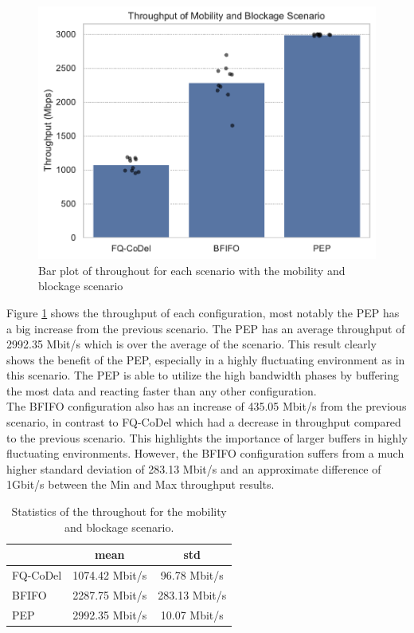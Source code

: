 \documentclass[a4paper,english, 12pt]{report}
\begin{document}
\begin{figure}[!h!] %
	\centering
	\includegraphics[scale=0.70]{../diagrams/witestlab/throughput/throughput_mobb.pdf}
  	\caption{Bar plot of throughout for each scenario with the mobility and blockage scenario}
  	\label{fig:throughput_mobb}
\end{figure}

Figure \ref{fig:throughput_mobb} shows the throughput of each configuration, most notably the PEP has a big increase from the previous scenario. The PEP has an average throughput of 2992.35 Mbit/s which is over the average of the scenario. This result clearly shows the benefit of the PEP, especially in a highly fluctuating environment as in this scenario. The PEP is able to utilize the high bandwidth phases by buffering the most data and reacting faster than any other configuration.\\

The BFIFO configuration also has an increase of 435.05 Mbit/s from the previous scenario, in contrast to FQ-CoDel which had a decrease in throughput compared to the previous scenario. This highlights the importance of larger buffers in highly fluctuating environments. However, the BFIFO configuration suffers from a much higher standard deviation of 283.13 Mbit/s and an approximate difference of 1Gbit/s between the Min and Max throughput results.\\

\begin{table}[h!]
\centering
\begin{tabular}{l|c|c}
\hline
 & \textbf{mean} & \textbf{std}  \\ 
\hline
FQ-CoDel & 1074.42 Mbit/s      & 96.78 Mbit/s     \\
BFIFO    & 2287.75 Mbit/s      & 283.13 Mbit/s   \\
PEP      & 2992.35 Mbit/s      & 10.07 Mbit/s    \\
\hline
\end{tabular}
\caption{Statistics of the throughout for the mobility and blockage scenario.}
\label{tab:throughput_mobb_table}
\end{table}
\end{document}
